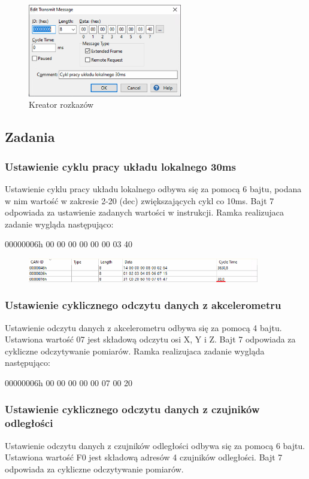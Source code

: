 \documentclass[margin = 2cm]{article}
\begin{document}
		\begin{figure}[H]
			\centering
			\includegraphics[width=0.6\textwidth]{edytorinstrukcji}
			\caption{Kreator rozkazów}
		\end{figure}
	\subsection{Zadania}
		\subsubsection{Ustawienie cyklu pracy układu lokalnego 30ms}
\label{a}
Ustawienie cyklu pracy układu lokalnego odbywa się za pomocą 6 bajtu, podana w nim wartość w zakresie 2-20 (dec) zwiększających cykl co 10ms. Bajt 7 odpowiada za ustawienie zadanych wartości w instrukcji.  Ramka realizujaca zadanie wygląda następująco:

00000006h	00 00 00 00 00 00 03 40

		\begin{figure}[H]
			\centering
			\includegraphics[width=0.9\textwidth]{30ms}
		\end{figure}

		\subsubsection{Ustawienie cyklicznego odczytu danych z akcelerometru}
Ustawienie odczytu danych z akcelerometru odbywa się za pomocą 4 bajtu. Ustawiona wartość 07 jest składową odczytu osi X, Y i Z. Bajt 7 odpowiada za cykliczne odczytywanie pomiarów. Ramka realizujaca zadanie wygląda następująco:

00000006h	00 00 00 00 00 07 00 20
		\subsubsection{Ustawienie cyklicznego odczytu danych z czujników odległości}
Ustawienie odczytu danych z czujników odległości odbywa się za pomocą 6 bajtu. Ustawiona wartość F0 jest składową adresów 4 czujników odległości. Bajt 7 odpowiada za cykliczne odczytywanie pomiarów. 
\end{document}
